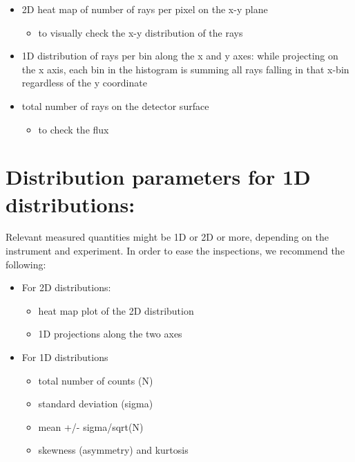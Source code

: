 \documentclass{article}
\begin{document}
\begin{itemize}
\item 2D heat map of number of rays per pixel on the x-y plane
  \begin{itemize}
  \item to visually check the x-y distribution of the rays
  \end{itemize}
\item 1D distribution of rays per bin along the x and y axes: while
  projecting on the x axis, each bin in the histogram is summing all
  rays falling in that x-bin regardless of the y coordinate
\item total number of rays on the detector surface

  \begin{itemize}
  \item to check the flux
  \end{itemize}
\end{itemize}

\section{Distribution parameters for 1D
distributions:}\label{distribution-parameters-for-1d-distributions}

Relevant measured quantities might be 1D or 2D or more, depending on the
instrument and experiment. In order to ease the inspections, we
recommend the following:

\begin{itemize}
\item For 2D distributions:

  \begin{itemize}
  \item heat map plot of the 2D distribution
  \item 1D projections along the two axes
  \end{itemize}
\item For 1D distributions

  \begin{itemize}
  \item total number of counts (N)
  \item standard deviation (sigma)
  \item mean +/- sigma/sqrt(N)
  \item skewness (asymmetry)\cite{skweness} and kurtosis\cite{kurtosis}
  \end{itemize}
\end{itemize}


\printbibliography
\end{document}
